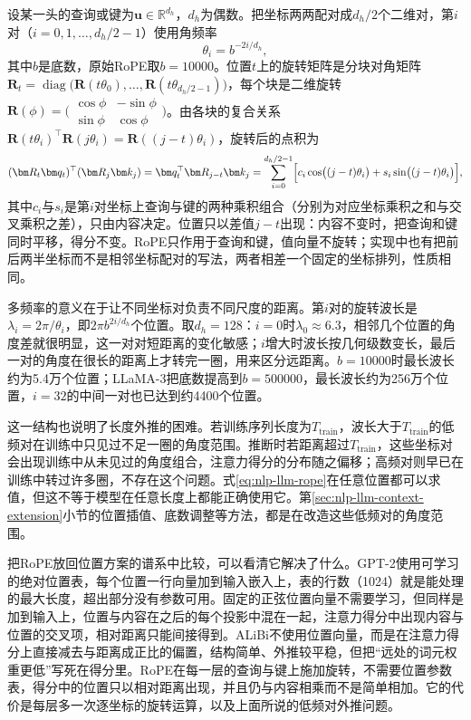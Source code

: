 设某一头的查询或键为$\bm u\in\mathbb R^{d_h}$，$d_h$为偶数。把坐标两两配对成$d_h/2$个二维对，第$i$对（$i=0,1,\ldots,d_h/2-1$）使用角频率
\[
  \theta_i=b^{-2i/d_h},
\]
其中$b$是底数，原始RoPE取$b=10000$。位置$t$上的旋转矩阵是分块对角矩阵$\bm R_t=\operatorname{diag}\bigl(\bm R(t\theta_0),\ldots,\bm R(t\theta_{d_h/2-1})\bigr)$，每个块是二维旋转$\bm R(\phi)=\bigl(\begin{smallmatrix}\cos\phi&-\sin\phi\\ \sin\phi&\cos\phi\end{smallmatrix}\bigr)$。由各块的复合关系$\bm R(t\theta_i)^{\top}\bm R(j\theta_i)=\bm R((j-t)\theta_i)$，旋转后的点积为
\begin{equation}
  (\bm R_t\bm q_t)^{\top}(\bm R_j\bm k_j)
  =\bm q_t^{\top}\bm R_{j-t}\bm k_j
  =\sum_{i=0}^{d_h/2-1}\Bigl[c_i\cos\bigl((j-t)\theta_i\bigr)+s_i\sin\bigl((j-t)\theta_i\bigr)\Bigr],
  \label{eq:nlp-llm-rope}
\end{equation}
其中$c_i$与$s_i$是第$i$对坐标上查询与键的两种乘积组合（分别为对应坐标乘积之和与交叉乘积之差），只由内容决定。位置只以差值$j-t$出现：内容不变时，把查询和键同时平移，得分不变。RoPE只作用于查询和键，值向量不旋转；实现中也有把前后两半坐标而不是相邻坐标配对的写法，两者相差一个固定的坐标排列，性质相同。

多频率的意义在于让不同坐标对负责不同尺度的距离。第$i$对的旋转波长是$\lambda_i=2\pi/\theta_i$，即$2\pi b^{2i/d_h}$个位置。取$d_h=128$：$i=0$时$\lambda_0\approx6.3$，相邻几个位置的角度差就很明显，这一对对短距离的变化敏感；$i$增大时波长按几何级数变长，最后一对的角度在很长的距离上才转完一圈，用来区分远距离。$b=10000$时最长波长约为5.4万个位置；LLaMA-3把底数提高到$b=500000$，最长波长约为256万个位置，$i=32$的中间一对也已达到约4400个位置。

这一结构也说明了长度外推的困难。若训练序列长度为$T_{\mathrm{train}}$，波长大于$T_{\mathrm{train}}$的低频对在训练中只见过不足一圈的角度范围。推断时若距离超过$T_{\mathrm{train}}$，这些坐标对会出现训练中从未见过的角度组合，注意力得分的分布随之偏移；高频对则早已在训练中转过许多圈，不存在这个问题。式\eqref{eq:nlp-llm-rope}在任意位置都可以求值，但这不等于模型在任意长度上都能正确使用它。第\ref{sec:nlp-llm-context-extension}小节的位置插值、底数调整等方法，都是在改造这些低频对的角度范围。

把RoPE放回位置方案的谱系中比较，可以看清它解决了什么。GPT-2使用可学习的绝对位置表，每个位置一行向量加到输入嵌入上，表的行数（1024）就是能处理的最大长度，超出部分没有参数可用。固定的正弦位置向量不需要学习，但同样是加到输入上，位置与内容在之后的每个投影中混在一起，注意力得分中出现内容与位置的交叉项，相对距离只能间接得到。ALiBi不使用位置向量，而是在注意力得分上直接减去与距离成正比的偏置，结构简单、外推较平稳，但把“远处的词元权重更低”写死在得分里。RoPE在每一层的查询与键上施加旋转，不需要位置参数表，得分中的位置只以相对距离出现，并且仍与内容相乘而不是简单相加。它的代价是每层多一次逐坐标的旋转运算，以及上面所说的低频对外推问题。

